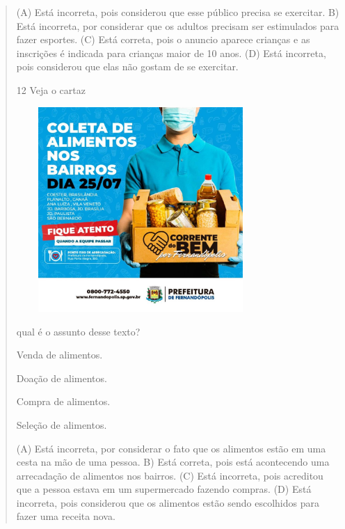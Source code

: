 \begin{verse}
(A) Está incorreta, pois considerou que esse público precisa se exercitar.
B) Está incorreta, por considerar que os adultos precisam ser
estimulados para fazer esportes.
(C) Está correta, pois o anuncio aparece crianças e as inscrições é
indicada para crianças maior de 10 anos.
(D) Está incorreta, pois considerou que elas não gostam de se exercitar.

\num{12} Veja o cartaz

\includegraphics[width=3.71207in,height=3.06667in]{media/image171.jpeg}


qual é o assunto desse texto?

\begin{escolha}
\item Venda de alimentos.

\item Doação de alimentos.

\item Compra de alimentos.

\item Seleção de alimentos.
\end{escolha}


(A) Está incorreta, por considerar o fato que os alimentos estão em uma
cesta na mão de uma pessoa.
B) Está correta, pois está acontecendo uma arrecadação de alimentos nos
bairros.
(C) Está incorreta, pois acreditou que a pessoa estava em um
supermercado fazendo compras.
(D) Está incorreta, pois considerou que os alimentos estão sendo
escolhidos para fazer uma receita nova.


\end{verse}
